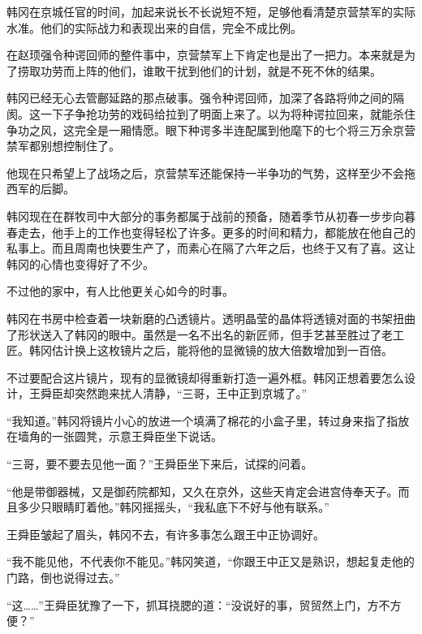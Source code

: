 韩冈在京城任官的时间，加起来说长不长说短不短，足够他看清楚京营禁军的实际水准。他们的实际战力和表现出来的自信，完全不成比例。

在赵顼强令种谔回师的整件事中，京营禁军上下肯定也是出了一把力。本来就是为了捞取功劳而上阵的他们，谁敢干扰到他们的计划，就是不死不休的结果。

韩冈已经无心去管鄜延路的那点破事。强令种谔回师，加深了各路将帅之间的隔阂。这一下子争抢功劳的戏码给拉到了明面上来了。以为将种谔拉回来，就能杀住争功之风，这完全是一厢情愿。眼下种谔多半连配属到他麾下的七个将三万余京营禁军都别想控制住了。

他现在只希望上了战场之后，京营禁军还能保持一半争功的气势，这样至少不会拖西军的后脚。

韩冈现在在群牧司中大部分的事务都属于战前的预备，随着季节从初春一步步向暮春走去，他手上的工作也变得轻松了许多。更多的时间和精力，都能放在他自己的私事上。而且周南也快要生产了，而素心在隔了六年之后，也终于又有了喜。这让韩冈的心情也变得好了不少。

不过他的家中，有人比他更关心如今的时事。

韩冈在书房中检查着一块新磨的凸透镜片。透明晶莹的晶体将透镜对面的书架扭曲了形状送入了韩冈的眼中。虽然是一名不出名的新匠师，但手艺甚至胜过了老工匠。韩冈估计换上这枚镜片之后，能将他的显微镜的放大倍数增加到一百倍。

不过要配合这片镜片，现有的显微镜却得重新打造一遍外框。韩冈正想着要怎么设计，王舜臣却突然跑来扰人清静，“三哥，王中正到京城了。”

“我知道。”韩冈将镜片小心的放进一个填满了棉花的小盒子里，转过身来指了指放在墙角的一张圆凳，示意王舜臣坐下说话。

“三哥，要不要去见他一面？”王舜臣坐下来后，试探的问着。

“他是带御器械，又是御药院都知，又久在京外，这些天肯定会进宫侍奉天子。而且多少只眼睛盯着他。”韩冈摇摇头，“我私底下不好与他有联系。”

王舜臣皱起了眉头，韩冈不去，有许多事怎么跟王中正协调好。

“我不能见他，不代表你不能见。”韩冈笑道，“你跟王中正又是熟识，想起复走他的门路，倒也说得过去。”

“这……”王舜臣犹豫了一下，抓耳挠腮的道：“没说好的事，贸贸然上门，方不方便？”

